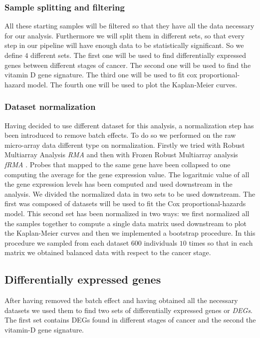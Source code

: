 \documentclass[fleqn,10pt]{SelfArx} %
\begin{document}
		\subsubsection{Sample splitting and filtering}
			All these starting samples will be filtered so that they have all the data necessary for our analysis.
			Furthermore we will split them in different sets, so that every step in our pipeline will have enough data to be statistically significant.
			So we define $4$ different sets.
			The first one will be used to find differentially expressed genes between different stages of cancer.
			The second one will be used to find the vitamin D gene signature.
			The third one will be used to fit cox proportional-hazard model.
			The fourth one will be used to plot the Kaplan-Meier curves.

		\subsubsection{Dataset normalization}
			Having decided to use different dataset for this analysis, a normalization step has been introduced to remove batch effects.
			To do so we performed on the raw micro-array data different type on normalization.
			Firstly we tried with Robust Multiarray Analysis \emph{RMA} \cite{rma} and then with Frozen Robust Multiarray analysis \emph{fRMA} \cite{frma}.
			Probes that mapped to the same gene have been collapsed to one computing the average for the gene expression value.
			The logaritmic value of all the gene expression levels has been computed and used downstream in the analysis.
			We divided the normalized data in two sets to be used downstream.
			The first was composed of datasets will be used to fit the Cox proportional-hazards model.
			This second set has been normalized in two ways: we first normalized all the samples together to compute a single data matrix used downstream to plot the Kaplan-Meier curves and then we implemented a bootstrap procedure.
			In this procedure we sampled from each dataset $600$ individuals $10$ times so that in each matrix we obtained balanced data with respect to the cancer stage.

	\subsection{Differentially expressed genes}
		After having removed the batch effect and having obtained all the necessary datasets we used them to find two sets of differentially expressed genes or \emph{DEGs}.
		The first set contains DEGs found in different stages of cancer and the second the vitamin-D gene signature.
\end{document}
